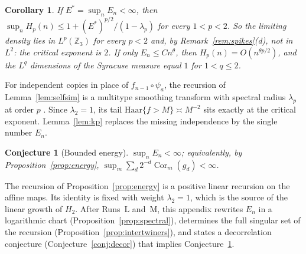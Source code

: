 \documentclass[12pt]{amsart}
\newtheorem{corollary}{Corollary}
\newtheorem{conjecture}{Conjecture}
\theoremstyle{definition}
\theoremstyle{remark}
\begin{document}
\begin{corollary}
\label{cor:lp}
If $E^*=\sup_nE_n<\infty$, then $\sup_nH_p(n)\le1+(E^*)^{p/2}/(1-\lambda_p)$ for every $1<p<2$. So the limiting density lies in $L^p(\mathbb Z_3)$ for every $p<2$ and, by Remark~\ref{rem:spikes}(d), not in $L^2$: the critical exponent is $2$. If only $E_n\le Cn^\theta$, then $H_p(n)=O(n^{\theta p/2})$, and the $L^q$ dimensions of the Syracuse measure equal $1$ for $1<q\le2$.
\end{corollary}

For independent copies in place of $f_{n-1}\circ\psi_a$, the recursion of Lemma~\ref{lem:selfsim} is a multitype smoothing transform with spectral radius $\lambda_p$ at order $p$ \cite{Durrett_Liggett_1983,Kahane_Peyriere_1976}. Since $\lambda_2=1$, its tail $\mathrm{Haar}\{f>M\}\asymp M^{-2}$ sits exactly at the critical exponent. Lemma~\ref{lem:kp} replaces the missing independence by the single number $E_n$.

\begin{conjecture}[Bounded energy]
\label{conj:energy}
$\sup_nE_n<\infty$; equivalently, by Proposition~\ref{prop:energy}, $\sup_m\sum_d2^{-d}\operatorname{Cor}_m(g_d)<\infty$.
\end{conjecture}

The recursion of Proposition~\ref{prop:energy} is a positive linear recursion on the affine maps. Its identity is fixed with weight $\lambda_2=1$, which is the source of the linear growth of $H_2$. After Runs~L and~M, this appendix rewrites $E_n$ in a logarithmic chart (Proposition~\ref{prop:spectral}), determines the full singular set of the recursion (Proposition~\ref{prop:intertwiners}), and states a decorrelation conjecture (Conjecture~\ref{conj:decor}) that implies Conjecture~\ref{conj:energy}.
\end{document}
